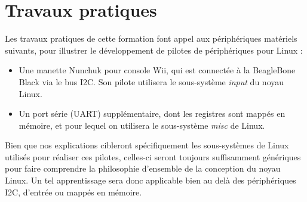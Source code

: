\documentclass[a4paper]{article}
\begin{document}
\feshowsidebar
\feshowfirstpage
\feshowboards

\section{Travaux pratiques}

Les travaux pratiques de cette formation font appel aux périphériques
matériels suivants, pour illustrer le développement de pilotes de
périphériques pour Linux :

\begin{itemize}
\item Une manette Nunchuk pour console Wii, qui est connectée à la
  BeagleBone Black via le bus I2C. Son pilote utilisera le
  sous-système {\em input} du noyau Linux.
\item Un port série (UART) supplémentaire, dont les registres sont
  mappés en mémoire, et pour lequel on utilisera le sous-système {\em
  misc} de Linux.
\end{itemize}

Bien que nos explications cibleront spécifiquement les sous-systèmes
de Linux utilisés pour réaliser ces pilotes, celles-ci seront toujours
suffisamment génériques pour faire comprendre la philosophie
d'ensemble de la conception du noyau Linux. Un tel apprentissage
sera donc applicable bien au delà des périphériques I2C, d'entrée ou
mappés en mémoire.

\onsiteagenda
\end{document}
